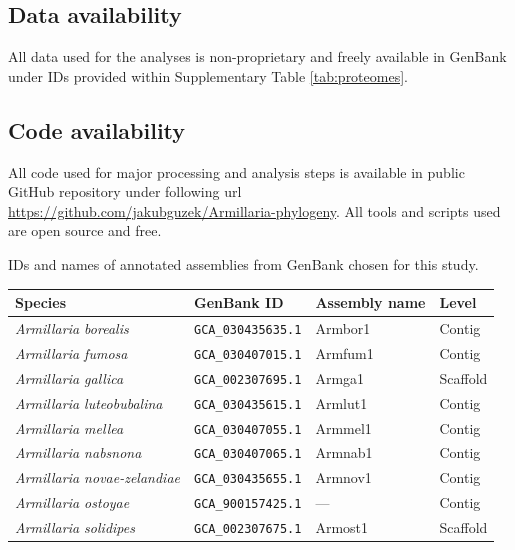 \documentclass[two column, twoside, a4paper]{article}
\begin{document}
\subsection{Data availability}

All data used for the analyses is non-proprietary and freely available in GenBank under IDs provided within Supplementary Table \ref{tab:proteomes}.

\subsection{Code availability}

All code used for major processing and analysis steps is available in public GitHub repository under following url \url{https://github.com/jakubguzek/Armillaria-phylogeny}. All tools and scripts used are open source and free.

\newpage
\printbibliography

\scriptsize
\pagebreak

\begin{supptable*}
  \caption{IDs and names of annotated assemblies from GenBank chosen for this study.}
  \label{tab:proteomes}
  \begin{center}
    \begin{tabular}[c]{llll}
      \toprule
      \textbf{Species} & \textbf{GenBank ID} & \textbf{Assembly name} & \textbf{Level} \\
      \midrule
      \textit{Armillaria borealis} & \texttt{GCA\_030435635.1} & Armbor1 & Contig \\
      \textit{Armillaria fumosa} & \texttt{GCA\_030407015.1} & Armfum1 & Contig \\
      \textit{Armillaria gallica} & \texttt{GCA\_002307695.1} & Armga1 & Scaffold \\
      \textit{Armillaria luteobubalina} & \texttt{GCA\_030435615.1} & Armlut1 & Contig \\
      \textit{Armillaria mellea} & \texttt{GCA\_030407055.1} & Armmel1 & Contig \\
      \textit{Armillaria nabsnona} & \texttt{GCA\_030407065.1} & Armnab1 & Contig \\
      \textit{Armillaria novae-zelandiae} & \texttt{GCA\_030435655.1} & Armnov1 & Contig \\
      \textit{Armillaria ostoyae} & \texttt{GCA\_900157425.1} & --- & Contig \\
      \textit{Armillaria solidipes} & \texttt{GCA\_002307675.1} & Armost1 & Scaffold \\
      \bottomrule
    \end{tabular}
  \end{center}
\end{supptable*}
\end{document}
